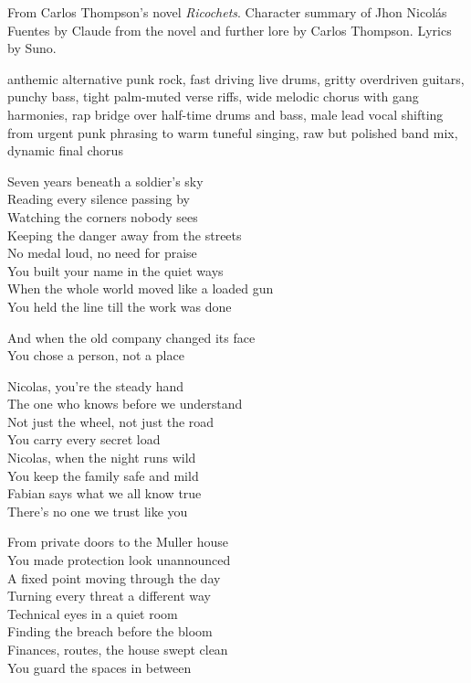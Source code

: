 
\begin{notes}
From Carlos Thompson's novel \emph{Ricochets}. Character summary of Jhon Nicolás Fuentes by Claude from the novel and further lore by Carlos Thompson. Lyrics by Suno.
\end{notes}
\begin{style}
anthemic alternative punk rock, fast driving live drums, gritty overdriven guitars, punchy bass, tight palm-muted verse riffs, wide melodic chorus with gang harmonies, rap bridge over half-time drums and bass, male lead vocal shifting from urgent punk phrasing to warm tuneful singing, raw but polished band mix, dynamic final chorus
\end{style}
\begin{lyrics}
Seven years beneath a soldier’s sky\\
Reading every silence passing by\\
Watching the corners nobody sees\\
Keeping the danger away from the streets\\
No medal loud, no need for praise\\
You built your name in the quiet ways\\
When the whole world moved like a loaded gun\\
You held the line till the work was done

And when the old company changed its face\\
You chose a person, not a place

Nicolas, you’re the steady hand\\
The one who knows before we understand\\
Not just the wheel, not just the road\\
You carry every secret load\\
Nicolas, when the night runs wild\\
You keep the family safe and mild\\
Fabian says what we all know true\\
There’s no one we trust like you

From private doors to the Muller house\\
You made protection look unannounced\\
A fixed point moving through the day\\
Turning every threat a different way\\
Technical eyes in a quiet room\\
Finding the breach before the bloom\\
Finances, routes, the house swept clean\\
You guard the spaces in between


\end{lyrics}
